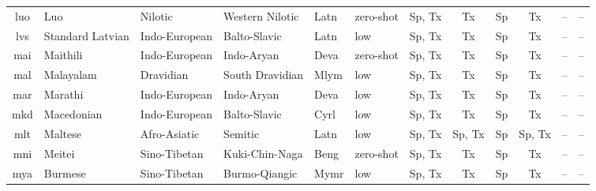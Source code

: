 \begin{table}[!p]
\begin{tabular}{clHHllcccccc}
luo & Luo & Nilotic & Western Nilotic & Latn & zero-shot & Sp, Tx & Tx & Sp & Tx & -- & -- \\
lvs & Standard Latvian & Indo-European & Balto-Slavic & Latn & low & Sp, Tx & Tx & Sp & Tx & -- & -- \\
mai & Maithili & Indo-European & Indo-Aryan & Deva & zero-shot & Sp, Tx & Tx & Sp & Tx & -- & -- \\
mal & Malayalam & Dravidian & South Dravidian & Mlym & low & Sp, Tx & Tx & Sp & Tx & -- & -- \\
mar & Marathi & Indo-European & Indo-Aryan & Deva & low & Sp, Tx & Tx & Sp & Tx & -- & -- \\
mkd & Macedonian & Indo-European & Balto-Slavic & Cyrl & low & Sp, Tx & Tx & Sp & Tx & -- & -- \\
mlt & Maltese & Afro-Asiatic & Semitic & Latn & low & Sp, Tx & Sp, Tx  & Sp & Sp, Tx & -- & -- \\
mni & Meitei & Sino-Tibetan & Kuki-Chin-Naga & Beng & zero-shot & Sp, Tx & Tx & Sp & Tx & -- & -- \\
mya & Burmese & Sino-Tibetan & Burmo-Qiangic & Mymr & low & Sp, Tx & Tx & Sp & Tx & -- & -- \\
\bottomrule
\end{tabular}
\end{table}

